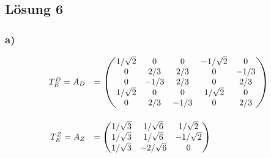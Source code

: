 \documentclass[main.tex]{subfiles}
\begin{document}
\subsection{Lösung 6}
\subsubsection{a)}
\begin{align*}
    \begin{array}{rl}
        T^D_E = A_D & = \begin{pmatrix}
            1/\sqrt{2} & 0 & 0 & -1/\sqrt{2} & 0\\
            0 & 2/3 & 2/3 & 0 & -1/3\\
            0 & -1/3 & 2/3 & 0 & 2/3\\
            1/\sqrt{2} & 0 & 0 & 1/\sqrt{2} & 0\\
            0 & 2/3 & -1/3 & 0 & 2/3\\
        \end{pmatrix}\\[1.4cm]
        T^Z_E = A_Z & = \begin{pmatrix}
            1/\sqrt{3} & 1/\sqrt{6} & 1/\sqrt{2}\\ 
            1/\sqrt{3} & 1/\sqrt{6} & -1/\sqrt{2}\\
            1/\sqrt{3} & -2/\sqrt{6} & 0
        \end{pmatrix}		
    \end{array}
\end{align*}
\end{document}
